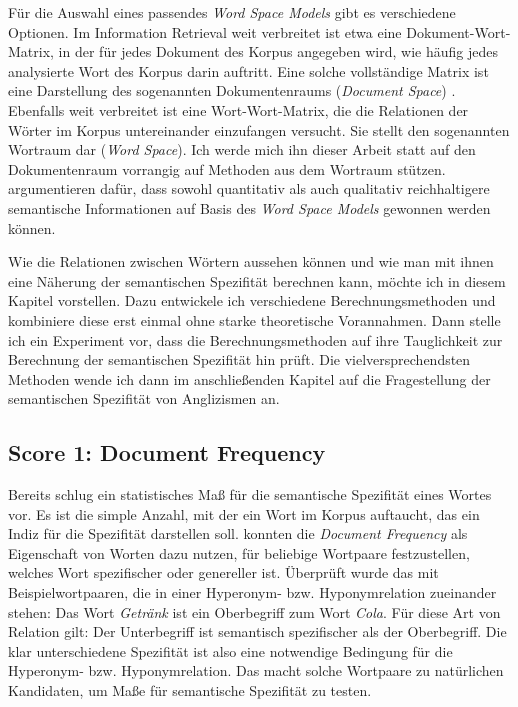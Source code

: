 \documentclass[11pt,numbers=noenddot]{scrartcl}
\begin{document}
Für die Auswahl eines passendes \emph{Word Space Models} gibt es verschiedene Optionen. Im Information Retrieval weit verbreitet ist etwa eine Dokument-Wort-Matrix, in der für jedes Dokument des Korpus angegeben wird, wie häufig jedes analysierte Wort des Korpus darin auftritt. Eine solche vollständige Matrix ist eine Darstellung des sogenannten Dokumentenraums (\emph{Document Space}) \citep[S.296]{manning1999}. Ebenfalls weit verbreitet ist eine Wort-Wort-Matrix, die die Relationen der Wörter im Korpus untereinander einzufangen versucht. Sie stellt den sogenannten Wortraum dar (\emph{Word Space}). Ich werde mich ihn dieser Arbeit statt auf den Dokumentenraum vorrangig auf Methoden aus dem Wortraum stützen. \citet{Schutze:1994:CTT:2856823.2856847} argumentieren dafür, dass sowohl quantitativ als auch qualitativ reichhaltigere semantische Informationen auf Basis des \emph{Word Space Models} gewonnen werden können.

Wie die Relationen zwischen Wörtern aussehen können und wie man mit ihnen eine Näherung der semantischen Spezifität berechnen kann, möchte ich in diesem Kapitel vorstellen. Dazu entwickele ich verschiedene Berechnungsmethoden und kombiniere diese erst einmal ohne starke theoretische Vorannahmen. Dann stelle ich ein Experiment vor, dass die Berechnungsmethoden auf ihre Tauglichkeit zur Berechnung der semantischen Spezifität hin prüft. Die vielversprechendsten Methoden wende ich dann im anschließenden Kapitel auf die Fragestellung der semantischen Spezifität von Anglizismen an.

\subsection{Score 1: Document Frequency} \label{df}
Bereits \citet{sparckjones1972} schlug ein statistisches Maß für die semantische Spezifität eines Wortes vor. Es ist die simple Anzahl, mit der ein Wort im Korpus auftaucht, das ein Indiz für die Spezifität darstellen soll. \citet{Caraballo99determiningthe} konnten die \emph{Document Frequency} als Eigenschaft von Worten dazu nutzen, für beliebige Wortpaare festzustellen, welches Wort  spezifischer oder genereller ist. Überprüft wurde das mit Beispielwortpaaren, die in einer Hyperonym- bzw. Hyponymrelation zueinander stehen: Das Wort \emph{Getränk} ist ein Oberbegriff zum Wort \emph{Cola}. Für diese Art von Relation gilt: Der Unterbegriff ist semantisch spezifischer als der Oberbegriff. Die klar unterschiedene Spezifität ist also eine notwendige Bedingung für die Hyperonym- bzw. Hyponymrelation. Das macht solche Wortpaare zu natürlichen Kandidaten, um Maße für semantische Spezifität zu testen.
\end{document}

